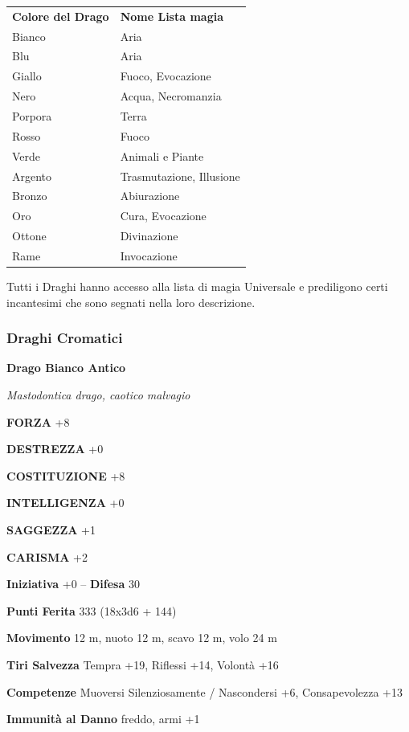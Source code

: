 \begin{multicols}{2}
	\begin{tabular}{ll}
		\hline
		\textbf{Colore del Drago}	& \textbf{Nome Lista magia} \\
		Bianco& Aria\\
		Blu& Aria\\
		Giallo& Fuoco, Evocazione\\
		Nero&Acqua, Necromanzia\\
		Porpora&Terra\\
		Rosso&Fuoco\\
		Verde&Animali e Piante\\
		Argento&Trasmutazione, Illusione\\
		Bronzo&Abiurazione\\
		Oro&Cura, Evocazione\\
		Ottone&Divinazione\\
		Rame&Invocazione\\
	\end{tabular}

	\medskip

	Tutti i Draghi hanno accesso alla lista di magia Universale e prediligono certi incantesimi che sono segnati nella loro descrizione.

	\subsubsection{Draghi Cromatici}

	\medskip{}\textbf{Drago Bianco Antico}

	\textit{Mastodontica drago, caotico malvagio}

	\textbf{FORZA} +8

	\textbf{DESTREZZA} +0

	\textbf{COSTITUZIONE} +8

	\textbf{INTELLIGENZA} +0

	\textbf{SAGGEZZA} +1

	\textbf{CARISMA} +2

	\textbf{Iniziativa} +0 -- \textbf{Difesa} 30

	\textbf{Punti Ferita} 333 (18x3d6 + 144)

	\textbf{Movimento} 12 m, nuoto 12 m, scavo 12 m, volo 24 m

	\textbf{Tiri Salvezza} Tempra +19, Riflessi +14, Volontà +16

	\textbf{Competenze} Muoversi Silenziosamente / Nascondersi +6, Consapevolezza +13

	\textbf{Immunità al Danno} freddo, armi +1


\end{multicols}
